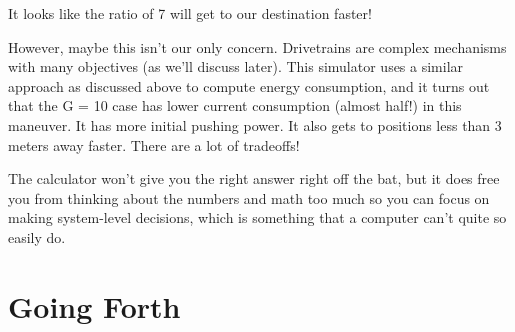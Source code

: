 \documentclass[10pt,letterpaper]{book}
\begin{document}
	It looks like the ratio of 7 will get to our destination faster!
	
	However, maybe this isn't our only concern. Drivetrains are complex mechanisms with many objectives (as we'll discuss later). This simulator uses a similar approach as discussed above to compute energy consumption, and it turns out that the G = 10 case has lower current consumption (almost half!) in this maneuver. It has more initial pushing power. It also gets to positions less than 3 meters away faster. There are a lot of tradeoffs!
	
	The calculator won't give you the right answer right off the bat, but it does free you from thinking about the numbers and math too much so you can focus on making system-level decisions, which is something that a computer can't quite so easily do.
	
\chapter{Going Forth}
\end{document}
